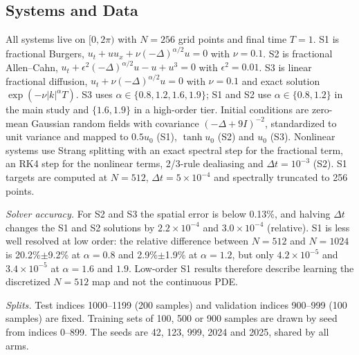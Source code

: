 \documentclass[conference]{IEEEtran}
\begin{document}
\subsection{Systems and Data}
All systems live on $[0,2\pi)$ with $N=256$ grid points and final time $T=1$. S1 is fractional Burgers, $u_t+uu_x+\nu(-\Delta)^{\alpha/2}u=0$ with $\nu=0.1$. S2 is fractional Allen--Cahn, $u_t+\epsilon^{2}(-\Delta)^{\alpha/2}u-u+u^3=0$ with $\epsilon^{2}=0.01$. S3 is linear fractional diffusion, $u_t+\nu(-\Delta)^{\alpha/2}u=0$ with $\nu=0.1$ and exact solution $\exp(-\nu|k|^{\alpha}T)$. S3 uses $\alpha\in\{0.8,1.2,1.6,1.9\}$; S1 and S2 use $\alpha\in\{0.8,1.2\}$ in the main study and $\{1.6,1.9\}$ in a high-order tier. Initial conditions are zero-mean Gaussian random fields with covariance $(-\Delta+9I)^{-2}$, standardized to unit variance and mapped to $0.5u_0$ (S1), $\tanh u_0$ (S2) and $u_0$ (S3). Nonlinear systems use Strang splitting with an exact spectral step for the fractional term, an RK4 step for the nonlinear terms, 2/3-rule dealiasing and $\Delta t=10^{-3}$ (S2). S1 targets are computed at $N=512$, $\Delta t=5\times10^{-4}$ and spectrally truncated to 256 points.

\emph{Solver accuracy.} For S2 and S3 the spatial error is below 0.13\%, and halving $\Delta t$ changes the S1 and S2 solutions by $2.2\times10^{-4}$ and $3.0\times10^{-4}$ (relative). S1 is less well resolved at low order: the relative difference between $N=512$ and $N=1024$ is 20.2\%$\pm$9.2\% at $\alpha=0.8$ and 2.9\%$\pm$1.9\% at $\alpha=1.2$, but only $4.2\times10^{-5}$ and $3.4\times10^{-5}$ at $\alpha=1.6$ and $1.9$. Low-order S1 results therefore describe learning the discretized $N=512$ map and not the continuous PDE.

\emph{Splits.} Test indices 1000--1199 (200 samples) and validation indices 900--999 (100 samples) are fixed. Training sets of 100, 500 or 900 samples are drawn by seed from indices 0--899. The seeds are 42, 123, 999, 2024 and 2025, shared by all arms.
\end{document}
